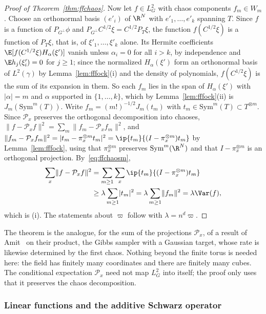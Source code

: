 \begin{proof}[Proof of Theorem~\ref{thm:ffchaos}]
Now let $f\in L^2_G$ with chaos components $f_m\in W_m$. Choose an
orthonormal basis $(e'_i)$ of $\R^N$ with $e'_1,\dots,e'_k$ spanning $T$.
Since $f$ is a function of $P_{G^\perp}\phi$ and $P_{G^\perp}C^{1/2}\xi=
C^{1/2}P_T\xi$, the function $f(C^{1/2}\xi)$ is a function of $P_T\xi$, that
is, of $\xi'_1,\dots,\xi'_k$ alone. Its Hermite coefficients
$\E[f(C^{1/2}\xi)H_\alpha(\xi')]$ vanish unless $\alpha_i=0$ for all $i>k$,
by independence and $\E h_j(\xi'_i)=0$ for $j\ge1$; since the normalized
$H_\alpha(\xi')$ form an orthonormal basis of $L^2(\gamma)$ by
Lemma~\ref{lem:fffock}(i) and the density of polynomials, $f(C^{1/2}\xi)$
is the sum of its expansion in them. So each $f_m$ lies in the span of $H_\alpha(\xi')$ with $\lvert\alpha
\rvert=m$ and $\alpha$ supported in $\{1,\dots,k\}$, which by
Lemma~\ref{lem:fffock}(ii) is $J_m(\mathrm{Sym}^m(T))$. Write $f_m=
(m!)^{-1/2}J_m(t_m)$ with $t_m\in\mathrm{Sym}^m(T)\subset T^{\otimes m}$.
Since $\mathcal P_x$ preserves the orthogonal decomposition into chaoses,
$\lVert f-\mathcal P_xf\rVert^2=\sum_m\lVert f_m-\mathcal P_xf_m\rVert^2$,
and $\lVert f_m-\mathcal P_xf_m\rVert^2=\lvert t_m-\pi_x^{\otimes m}t_m
\rvert^2=\ip{t_m}{(I-\pi_x^{\otimes m})t_m}$ by Lemma~\ref{lem:fffock}, using
that $\pi_x^{\otimes m}$ preserves $\mathrm{Sym}^m(\R^N)$ and that $I-\pi_x^{
\otimes m}$ is an orthogonal projection. By~\eqref{eq:ffchaosm},
\begin{align*}
\sum_x\lVert f-\mathcal P_xf\rVert^2&=\sum_{m\ge1}\sum_x\ip{t_m}{(I-\pi_x^{
\otimes m})t_m}\\
&\ge\lambda\sum_{m\ge1}\lvert t_m\rvert^2=\lambda\sum_{m\ge1}
\lVert f_m\rVert^2=\lambda\Var(f),
\end{align*}
which is (i). The statements about $\varpi$ follow with $\lambda=n^d\varpi$.
\end{proof}

\begin{remark}
The theorem is the analogue, for the sum of the projections $\mathcal P_x$,
of a result of Amit~\cite{Ami91} on their product, the Gibbs sampler with a
Gaussian target, whose rate is likewise determined by the first chaos. Nothing beyond the
finite torus is needed here: the field has finitely many coordinates and
there are finitely many cubes. The conditional expectation $\mathcal P_x$
need not map $L^2_G$ into itself; the proof only uses that it preserves the
chaos decomposition.
\end{remark}

\subsubsection{Linear functions and the additive Schwarz operator}

